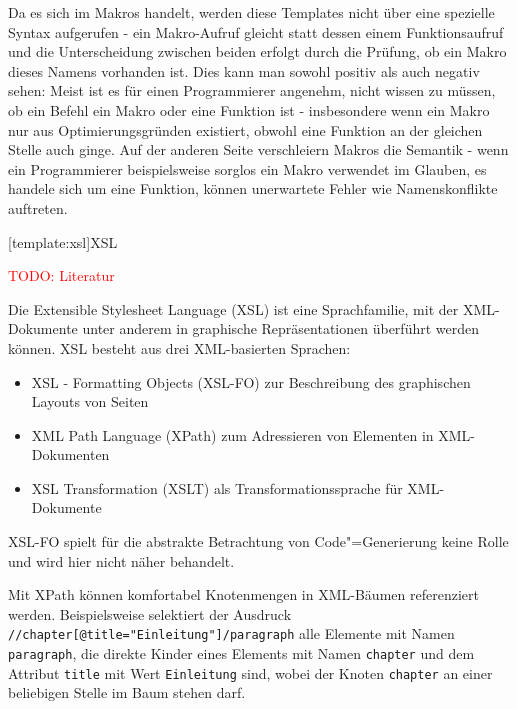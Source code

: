 \documentclass[11pt, a4paper, bibgerm]{book}
\newcommand\icode[1]{\lstinline?#1?}
\newcommand{\todo}[1]{
  \textcolor{red}{TODO: #1}
}
\newcommand\lsection{}
\newcommand{\cgen}{Code"=Generierung}
\begin{document}
Da es sich im Makros handelt, werden diese Templates nicht über eine
spezielle Syntax aufgerufen - ein Makro-Aufruf gleicht statt dessen
einem Funktionsaufruf und die Unterscheidung zwischen beiden erfolgt
durch die Prüfung, ob ein Makro dieses Namens vorhanden ist. Dies kann
man sowohl positiv als auch negativ sehen: Meist ist es für einen
Programmierer angenehm, nicht wissen zu müssen, ob ein Befehl ein Makro
oder eine Funktion ist - insbesondere wenn ein Makro nur aus
Optimierungsgründen existiert, obwohl eine Funktion an der gleichen
Stelle auch ginge. Auf der anderen Seite verschleiern Makros die
Semantik - wenn ein Programmierer beispielsweise sorglos ein Makro
verwendet im Glauben, es handele sich um eine Funktion, können
unerwartete Fehler wie Namenskonflikte auftreten.

\lsection[template:xsl]{XSL}

\todo{Literatur}

Die Extensible Stylesheet Language (XSL) ist eine Sprachfamilie, mit der
XML-Dokumente unter anderem in graphische Repräsentationen überführt
werden können. XSL besteht aus drei XML-basierten Sprachen:
\begin{itemize}
\item XSL - Formatting Objects (XSL-FO) zur Beschreibung des graphischen Layouts von Seiten
\item XML Path Language (XPath) zum Adressieren von Elementen in XML-Dokumenten
\item XSL Transformation (XSLT) als Transformationssprache für XML-Dokumente
\end{itemize}
XSL-FO spielt für die abstrakte Betrachtung von \cgen{} keine Rolle und
wird hier nicht näher behandelt.

Mit XPath können komfortabel Knotenmengen in XML-Bäumen referenziert
werden. Beispielsweise selektiert der Ausdruck
\icode{//chapter[@title="Einleitung"]/paragraph} alle Elemente mit Namen
\icode{paragraph}, die direkte Kinder eines Elements mit Namen
\icode{chapter} und dem Attribut \icode{title} mit Wert
\icode{Einleitung} sind, wobei der Knoten \icode{chapter} an einer
beliebigen Stelle im Baum stehen darf.
\end{document}
